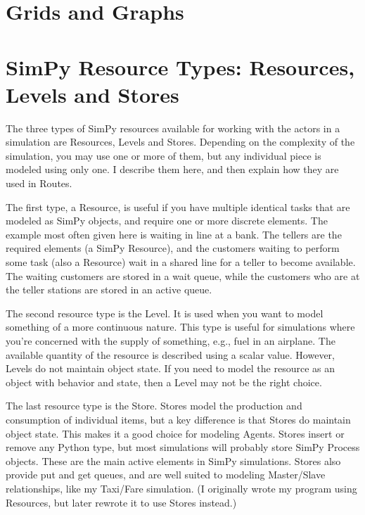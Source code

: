 \documentclass[11pt,letterpaper,onecolumn,twoside,openright,draft]{report}
\begin{document}
\section{Grids and Graphs}


\section{SimPy Resource Types: Resources, Levels and Stores}
The three types of SimPy resources available for working with the actors in a simulation are Resources, Levels and Stores.
Depending on the complexity of the simulation, you may use one or more of them, but any individual piece is modeled using only one.
I describe them here, and then explain how they are used in Routes.

The first type, a Resource, is useful if you have multiple identical tasks that are modeled as SimPy objects, and require one or more discrete elements.
The example most often given here is waiting in line at a bank.
The tellers are the required elements (a SimPy Resource), and the customers waiting to perform some task (also a Resource) wait in a shared line for a teller to become available.
The waiting customers are stored in a wait queue, while the customers who are at the teller stations are stored in an active queue.

The second resource type is the Level.
It is used when you want to model something of a more continuous nature.
This type is useful for simulations where you're concerned with the supply of something, e.g., fuel in an airplane.
The available quantity of the resource is described using a scalar value.
However, Levels do not maintain object state.
If you need to model the resource as an object with behavior and state, then a Level may not be the right choice.

The last resource type is the Store.
Stores model the production and consumption of individual items, but a key difference is that Stores do maintain object state.
This makes it a good choice for modeling Agents.
Stores insert or remove any Python type, but most simulations will probably store SimPy Process objects.
These are the main active elements in SimPy simulations.
Stores also provide put and get queues, and are well suited to modeling Master/Slave relationships, like my Taxi/Fare simulation.
(I originally wrote my program using Resources, but later rewrote it to use Stores instead.)
\end{document}
